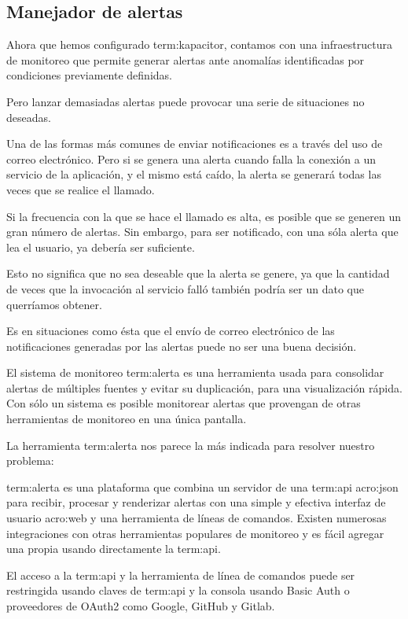 \subsection{Manejador de alertas}
\label{manejador-alertas}

Ahora que hemos configurado \gls{term:kapacitor}, contamos con una
infraestructura de monitoreo que permite generar alertas ante anomalías
identificadas por condiciones previamente definidas.

Pero lanzar demasiadas alertas puede provocar una serie de situaciones no
deseadas.

Una de las formas más comunes de enviar notificaciones es a través del uso de
correo electrónico. Pero si se genera una alerta cuando falla la conexión a un
servicio de la aplicación, y el mismo está caído, la alerta se generará todas
las veces que se realice el llamado.

Si la frecuencia con la que se hace el llamado es alta, es posible que se
generen un gran número de alertas. Sin embargo, para ser notificado, con una
sóla alerta que lea el usuario, ya debería ser suficiente.

Esto no significa que no sea deseable que la alerta se genere, ya que la
cantidad de veces que la invocación al servicio falló también podría ser un
dato que querríamos obtener.

Es en situaciones como ésta que el envío de correo electrónico de las
notificaciones generadas por las alertas puede no ser una buena decisión.

El sistema de monitoreo \gls{term:alerta} es una herramienta usada para
consolidar alertas de múltiples fuentes y evitar su duplicación, para una
visualización rápida. Con sólo un sistema es posible monitorear alertas que
provengan de otras herramientas de monitoreo en una única pantalla.

La herramienta \gls{term:alerta} nos parece la más indicada para resolver
nuestro problema:

\gls{term:alerta} es una plataforma que combina un servidor de una
\gls{term:api} \gls{acro:json} para recibir, procesar y renderizar alertas con
una simple y efectiva interfaz de usuario \gls{acro:web} y una herramienta de
líneas de comandos. Existen numerosas integraciones con otras herramientas
populares de monitoreo y es fácil agregar una propia usando directamente la
\gls{term:api}.

El acceso a la \gls{term:api} y la herramienta de línea de comandos puede ser
restringida usando claves de \gls{term:api} y la consola usando Basic Auth o
proveedores de OAuth2 como Google, GitHub y Gitlab.

